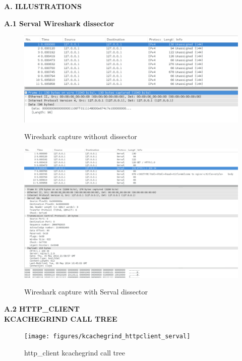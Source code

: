 \newpage
{}
{}
{\Huge \bf \noindent A. ILLUSTRATIONS}



\newpage
{}
{}
{\huge \bf \noindent A.1 Serval Wireshark dissector}\\[0.5cm]
\begin{figure}[H]
\centering
\includegraphics[trim = 0mm 0mm 70mm 0mm, clip, scale=0.5]{figures/wireshark_wo_dissector}
\label{fig:wirenodiss}
\caption[Wireshark capture without dissector]{Wireshark capture without dissector}
\end{figure}
\begin{figure}[H]
\centering
\includegraphics[trim = 0mm 0mm 180mm 0mm, clip, scale=0.5]{figures/wireshark_w_dissector}
\label{fig:wirediss}
\caption[Wireshark capture with Serval dissector]{Wireshark capture with Serval dissector}
\end{figure}


\newpage
{}
{}
{\huge \bf \noindent A.2 HTTP\_CLIENT\\[0.2cm] KCACHEGRIND CALL TREE}\\[0.5cm]
\begin{figure}[H]
\centering
\texttt{[image: figures/kcachegrind\_httpclient\_serval]}
\label{fig:kcachecalltree}
\caption[http\_client kcachegrind call tree]{http\_client kcachegrind call tree}
\end{figure}


